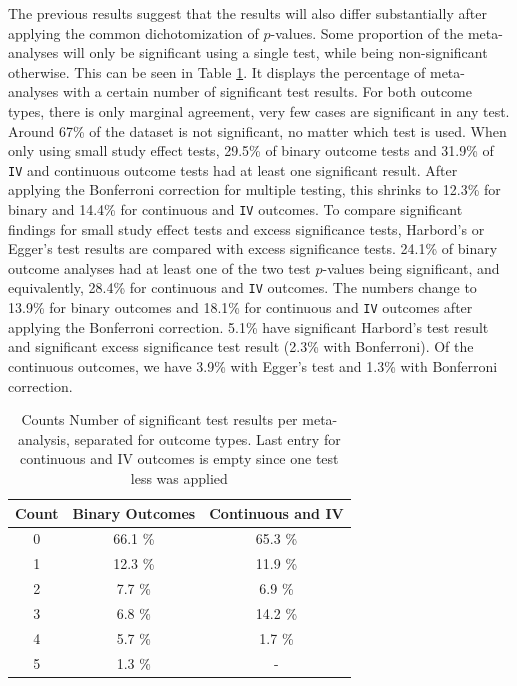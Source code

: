 \documentclass[11pt,a4paper,twoside]{book}\usepackage[]{graphicx}\usepackage[]{color}
\begin{document}
The previous results suggest that the results will also differ substantially after applying the common dichotomization of $p$-values. Some proportion of the meta-analyses will only be significant using a single test, while being non-significant otherwise. This can be seen in Table \ref{number.sig.tests}. It displays the percentage of meta-analyses with a certain number of significant test results. For both outcome types, there is only marginal agreement, very few cases are significant in any test. Around 67\% of the dataset is not significant, no matter which test is used. When only using small study effect tests, 29.5\% of binary outcome tests and 31.9\% of \texttt{IV} and continuous outcome tests had at least one significant result. After applying the Bonferroni correction for multiple testing, this shrinks to 12.3\% for binary and 14.4\% for continuous and \texttt{IV} outcomes. To compare significant findings for small study effect tests and excess significance tests, Harbord's or Egger's test results are compared with excess significance tests. 24.1\% of binary outcome analyses had at least one of the two test $p$-values being significant, and equivalently, 28.4\% for continuous and \texttt{IV} outcomes. The numbers change to 13.9\% for binary outcomes and 18.1\% for continuous and \texttt{IV} outcomes after applying the Bonferroni correction. 5.1\% have significant Harbord's test result and significant excess significance test result  (2.3\% with Bonferroni). Of the continuous outcomes, we have 3.9\% with Egger's test and 1.3\% with Bonferroni correction. \\

\begin{table}[ht]
\centering
\begingroup\footnotesize
\begin{tabular}{ccc}
  \hline
Count & Binary Outcomes & Continuous and IV \\ 
  \hline
0 & 66.1 \% & 65.3 \% \\ 
  1 & 12.3 \% & 11.9 \% \\ 
  2 & 7.7 \% & 6.9 \% \\ 
  3 & 6.8 \% & 14.2 \% \\ 
  4 & 5.7 \% & 1.7 \% \\ 
  5 & 1.3 \% & - \\ 
   \hline
\end{tabular}
\endgroup
\caption{Counts Number of significant test results per meta-analysis, separated
       for outcome types. Last entry for continuous and IV outcomes is empty since one test less was 
       applied} 
\label{number.sig.tests}
\end{table}
\end{document}
